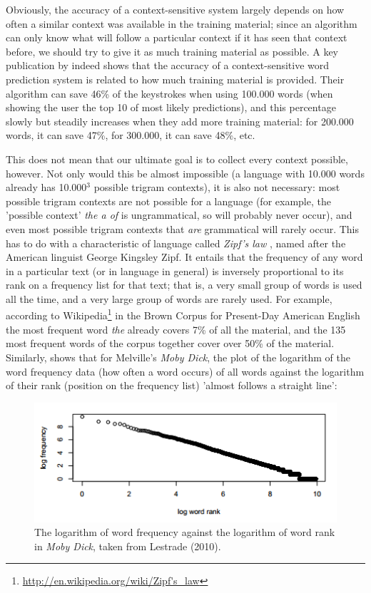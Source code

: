 \documentclass[12pt]{article}
\begin{document}
Obviously, the accuracy of a context-sensitive system largely depends on how often a similar context was available in the training material; since an algorithm can only know what will follow a particular context if it has seen that context before, we should try to give it as much training material as possible. A key publication by  indeed shows that the accuracy of a context-sensitive word prediction system is related to how much training material is provided. Their algorithm can save 46\% of the keystrokes when using 100.000 words (when showing the user the top 10 of most likely predictions), and this percentage slowly but steadily increases when they add more training material: for 200.000 words, it can save 47\%, for 300.000, it can save 48\%, etc.

This does not mean that our ultimate goal is to collect every context possible, however. Not only would this be almost impossible (a language with 10.000 words already has 10.000$^3$ possible trigram contexts), it is also not necessary: most possible trigram contexts are not possible for a language (for example, the 'possible context' \emph{the a of} is ungrammatical, so will probably never occur), and even most possible trigram contexts that \emph{are} grammatical will rarely occur. This has to do with a characteristic of language called \emph{Zipf's law} \cite{zipf65}, named after the American linguist George Kingsley Zipf. It entails that the frequency of any word in a particular text (or in language in general) is inversely proportional to its rank on a frequency list for that text; that is, a very small group of words is used all the time, and a very large group of words are rarely used. For example, according to Wikipedia\footnote{\url{http://en.wikipedia.org/wiki/Zipf's\_law}} in the Brown Corpus for Present-Day American English the most frequent word \emph{the} already covers 7\% of all the material, and the 135 most frequent words of the corpus together cover over 50\% of the material. Similarly,  shows that for Melville's \emph{Moby Dick}, the plot of the logarithm of the word frequency data (how often a word occurs) of all words against the logarithm of their rank (position on the frequency list) 'almost follows a straight line': 

\begin{figure}[H]
\includegraphics[scale=1]{lestrade} \centering
\caption{The logarithm of word frequency against the logarithm of word rank in \emph{Moby Dick}, taken from Lestrade (2010).}
\end{figure}
\end{document}
